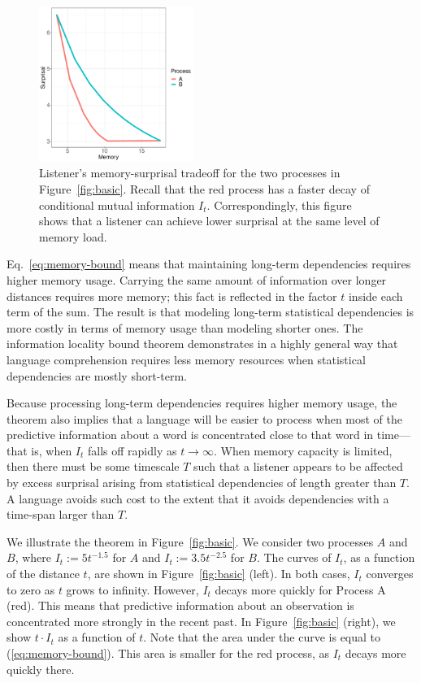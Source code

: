 \begin{figure}
\includegraphics[width=0.45\textwidth]{figures/listener-tradeoff.pdf}
	\caption{Listener's memory-surprisal tradeoff for the two processes in Figure~\ref{fig:basic}. Recall that the red process has a faster decay of conditional mutual information $I_t$. Correspondingly, this figure shows that a listener can achieve lower surprisal at the same level of memory load. }\label{fig:listener-tradeoff}
\end{figure}

Eq.~\ref{eq:memory-bound} means that maintaining long-term dependencies requires higher memory usage. Carrying the same amount of information over longer distances requires more memory; this fact is reflected in the factor $t$ inside each term of the sum. 
The result is that modeling long-term statistical dependencies is more costly in terms of memory usage than modeling shorter ones.
The information locality bound theorem demonstrates in a highly general way that language comprehension requires less memory resources when statistical dependencies are mostly short-term. 

Because processing long-term dependencies requires higher memory usage, the theorem also implies that a language will be easier to process when most of the predictive information about a word is concentrated close to that word in time---that is, when $I_t$ falls off rapidly as $t \rightarrow \infty$. When memory capacity is limited, then there must be some timescale $T$ such that a listener appears to be affected by excess surprisal arising from statistical dependencies of length greater than $T$. A language avoids such cost to the extent that it avoids dependencies with a time-span larger than $T$.

We illustrate the theorem in Figure~\ref{fig:basic}.
We consider two processes $A$ and $B$, where $I_t := 5t^{-1.5}$ for $A$ and $I_t := 3.5 t^{-2.5}$ for $B$.
The curves of $I_t$, as a function of the distance $t$, are shown in Figure~\ref{fig:basic} (left).
In both cases, $I_t$ converges to zero as $t$ grows to infinity. 
However, $I_t$ decays more quickly for Process A (red).
This means that predictive information about an observation is concentrated more strongly in the recent past.
In Figure~\ref{fig:basic} (right), we show $t\cdot I_t$ as a function of $t$.
Note that the area under the curve is equal to (\ref{eq:memory-bound}).
This area is smaller for the red process, as $I_t$ decays more quickly there.  





